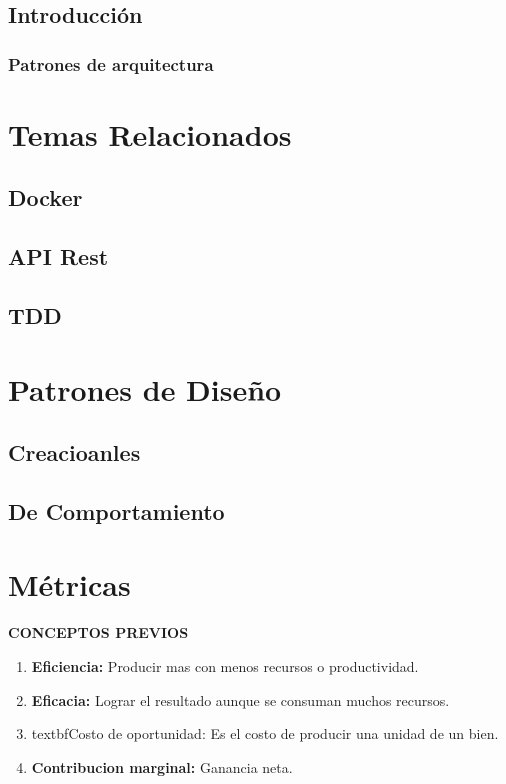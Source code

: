 \documentclass[12pt]{book}
\begin{document}
\section{Introducción}
\subsection{Patrones de arquitectura}

\chapter{Temas Relacionados}
\section{Docker}
\section{API Rest}
\section{TDD}

\chapter{Patrones de Diseño}
\section{Creacioanles}
\section{De Comportamiento}

\chapter{Métricas}
\textbf{CONCEPTOS PREVIOS}
\begin{enumerate}
	\item \textbf{Eficiencia:} Producir mas con menos recursos o productividad.
	\item \textbf{Eficacia:} Lograr el resultado aunque se consuman muchos recursos.
	\item textbf{Costo de oportunidad:} Es el costo de producir una unidad de un bien.
	\item \textbf{Contribucion marginal:} Ganancia neta.
\end{enumerate}
\end{document}
